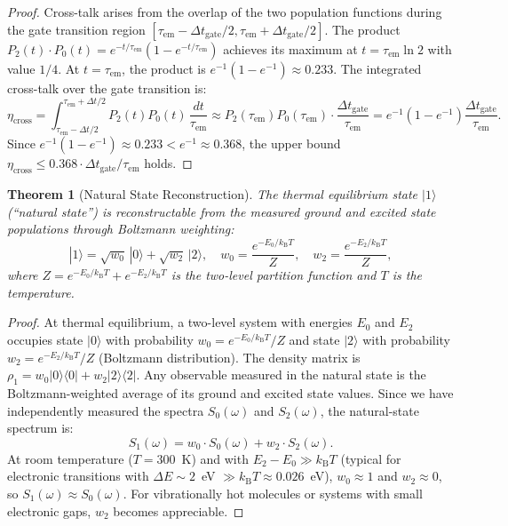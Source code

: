 \documentclass[11pt,twocolumn,a4paper]{article}
\newtheorem{theorem}{Theorem}[section]
\theoremstyle{definition}
\theoremstyle{remark}
\newcommand{\kB}{k_{\mathrm{B}}}
\begin{document}
\begin{proof}
Cross-talk arises from the overlap of the two population functions during the gate transition region $[\tau_{\mathrm{em}} - \Delta t_{\mathrm{gate}}/2, \tau_{\mathrm{em}} + \Delta t_{\mathrm{gate}}/2]$. The product $P_2(t) \cdot P_0(t) = e^{-t/\tau_{\mathrm{em}}}(1 - e^{-t/\tau_{\mathrm{em}}})$ achieves its maximum at $t = \tau_{\mathrm{em}} \ln 2$ with value $1/4$. At $t = \tau_{\mathrm{em}}$, the product is $e^{-1}(1 - e^{-1}) \approx 0.233$. The integrated cross-talk over the gate transition is:
\begin{equation}
\eta_{\mathrm{cross}} = \int_{\tau_{\mathrm{em}} - \Delta t/2}^{\tau_{\mathrm{em}} + \Delta t/2} P_2(t) P_0(t) \, \frac{dt}{\tau_{\mathrm{em}}} \approx P_2(\tau_{\mathrm{em}}) P_0(\tau_{\mathrm{em}}) \cdot \frac{\Delta t_{\mathrm{gate}}}{\tau_{\mathrm{em}}} = e^{-1}(1 - e^{-1}) \frac{\Delta t_{\mathrm{gate}}}{\tau_{\mathrm{em}}}.
\end{equation}
Since $e^{-1}(1-e^{-1}) \approx 0.233 < e^{-1} \approx 0.368$, the upper bound $\eta_{\mathrm{cross}} \leq 0.368 \cdot \Delta t_{\mathrm{gate}} / \tau_{\mathrm{em}}$ holds.
\end{proof}

\begin{theorem}[Natural State Reconstruction]
\label{thm:natural}
The thermal equilibrium state $|1\rangle$ (``natural state'') is reconstructable from the measured ground and excited state populations through Boltzmann weighting:
\begin{equation}
|1\rangle = \sqrt{w_0}\, |0\rangle + \sqrt{w_2}\, |2\rangle, \quad w_0 = \frac{e^{-E_0/\kB T}}{Z}, \quad w_2 = \frac{e^{-E_2/\kB T}}{Z},
\end{equation}
where $Z = e^{-E_0/\kB T} + e^{-E_2/\kB T}$ is the two-level partition function and $T$ is the temperature.
\end{theorem}

\begin{proof}
At thermal equilibrium, a two-level system with energies $E_0$ and $E_2$ occupies state $|0\rangle$ with probability $w_0 = e^{-E_0/\kB T}/Z$ and state $|2\rangle$ with probability $w_2 = e^{-E_2/\kB T}/Z$ (Boltzmann distribution). The density matrix is $\rho_1 = w_0 |0\rangle\langle 0| + w_2 |2\rangle\langle 2|$. Any observable measured in the natural state is the Boltzmann-weighted average of its ground and excited state values. Since we have independently measured the spectra $S_0(\omega)$ and $S_2(\omega)$, the natural-state spectrum is:
\begin{equation}
S_1(\omega) = w_0 \cdot S_0(\omega) + w_2 \cdot S_2(\omega).
\end{equation}
At room temperature ($T = 300$~K) and with $E_2 - E_0 \gg \kB T$ (typical for electronic transitions with $\Delta E \sim 2$~eV $\gg \kB T \approx 0.026$~eV), $w_0 \approx 1$ and $w_2 \approx 0$, so $S_1(\omega) \approx S_0(\omega)$. For vibrationally hot molecules or systems with small electronic gaps, $w_2$ becomes appreciable.
\end{proof}
\end{document}
